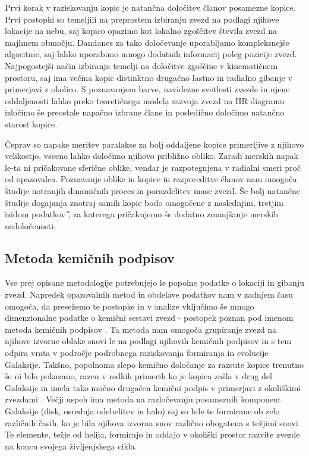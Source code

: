 Prvi korak v raziskovanju kopic je natančna določitev članov posamezne kopice. Prvi postopki so temeljili na preprostem izbiranju zvezd na podlagi njihove lokacije na nebu, saj kopico opazimo kot lokalno zgoščitev števila zvezd na majhnem območju. Dandanes za tako določevanje uporabljamo kompleksnejše algoritme, saj lahko uporabimo mnogo dodatnih informacij poleg pozicije zvezd. Najpogostejši način izbiranja temelji na določitve zgoščine v kinematičnem prostoru, saj ima večina kopic distinktno drugačno lastno in radialno gibanje v primerjavi z okolico. S poznavanjem barve, navidezne svetlosti zvezde in njene oddaljenosti lahko preko teoretičnega modela razvoja zvezd na HR diagramu izločimo še preostale napačno izbrane člane in posledično določimo natančno starost kopice.

Čeprav so napake meritev paralakse za bolj oddaljene kopice primerljive z njihovo velikostjo, vseeno lahko določimo njihovo približno obliko. Zaradi merskih napak le-ta ni pričakovane sferične oblike, vendar je razpotegnjena v radialni smeri proč od opazovalca. Poznavanje oblike in kopice in razporeditve članov nam omogoča študije notranjih dinamičnih proces in porazdelitev mase zvezd. Še bolj natančne študije dogajanja znotraj samih kopic bodo omogočene z naslednjim, tretjim izidom podatkov \G, za katerega pričakujemo še dodatno zmanjšanje merskih nedoločenosti.

\subsection{Metoda kemičnih podpisov}
Vse prej opisane metodologije potrebujejo le popolne podatke o lokaciji in gibanju zvezd. Napredek opazovalnih metod in obdelave podatkov nam v zadnjem času omogoča, da presežemo te postopke in v analize vključimo še mnogo dimenzionalne podatke o kemični sestavi zvezd - postopek poznan pod imenom metoda kemičnih podpisov \cite{2002ARA&A..40..487F, 2010ApJ...721..582B}. Ta metoda nam omogoča grupiranje zvezd na njihove izvorne oblake snovi le na podlagi njihovih kemičnih podpisov in s tem odpira vrata v področje podrobnega raziskovanja formiranja in evolucije Galaksije. Takšno, popolnoma slepo kemično določanje za razsute kopice trenutno še ni bilo pokazano, razen v redkih primerih ko je kopica zašla v drug del Galaksije in imela tako močno drugačen kemični podpis v primerjavi z okoliškimi zvezdami \cite{2016ApJ...833..262H}. Večji uspeh ima metoda na razločevanju posameznih komponent Galaksije (disk, osrednja odebelitev in halo) saj so bile te formirane ob zelo različnih časih, ko je bila njihova izvorna snov različno obogatena s težjimi snovi. Te elemente, težje od helija, formirajo in oddajo v okoliški prostor razvite zvezde na koncu svojega življenjskega cikla.

